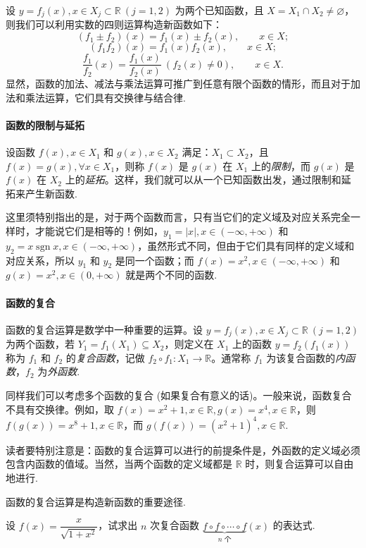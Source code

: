 设 $y=f_j(x),x\in X_j\subset\mathbb{R}\ (j=1,2)$ 为两个已知函数，且 $X=X_1\cap X_2\ne\varnothing$，则我们可以利用实数的四则运算构造新函数如下：
\[
  (f_1\pm f_2)(x)=f_1(x)\pm f_2(x),\qquad x\in X;
\]
\[
  (f_1f_2)(x)=f_1(x)f_2(x),\qquad x\in X;
\]
\[
  \frac{f_1}{f_2}(x)=\frac{f_1(x)}{f_2(x)}\ (f_2(x)\ne0),\qquad x\in X.
\]
显然，函数的加法、减法与乘法运算可推广到任意有限个函数的情形，而且对于加法和乘法运算，它们具有交换律与结合律.

\paragraph*{函数的限制与延拓}


设函数 $f(x),x\in X_1$ 和 $g(x),x\in X_2$ 满足：$X_1\subset X_2$，且 $f(x)=g(x),\forall x\in X_1$，则称 $f(x)$ 是 $g(x)$ 在 $X_1$ 上的\emph{限制}，而 $g(x)$ 是 $f(x)$ 在 $X_2$ 上的\emph{延拓}。这样，我们就可以从一个已知函数出发，通过限制和延拓来产生新函数.

这里须特别指出的是，对于两个函数而言，只有当它们的定义域及对应关系完全一样时，才能说它们是相等的！例如，$y_1=|x|,x\in(-\infty,+\infty)$ 和 $y_2=x\operatorname{sgn}x,x\in(-\infty,+\infty)$，虽然形式不同，但由于它们具有同样的定义域和对应关系，所以 $y_1$ 和 $y_2$ 是同一个函数；而 $f(x)=x^2,x\in(-\infty,+\infty)$ 和 $g(x)=x^2,x\in(0,+\infty)$ 就是两个不同的函数.

\paragraph*{函数的复合}


函数的复合运算是数学中一种重要的运算。设 $y=f_j(x),x\in X_j\subset\mathbb{R}\ (j=1,2)$ 为两个函数，若 $Y_1=f_1(X_1)\subseteq X_2$，则定义在 $X_1$ 上的函数 $y=f_2(f_1(x))$ 称为 $f_1$ 和 $f_2$ 的\emph{复合函数}，记做 $f_2\circ f_1:X_1\to\mathbb{R}$。通常称 $f_1$ 为该复合函数的\emph{内函数}，$f_2$ 为\emph{外函数}.

同样我们可以考虑多个函数的复合 (如果复合有意义的话)。一般来说，函数复合不具有交换律。例如，取 $f(x)=x^2+1,x\in\mathbb{R},g(x)=x^4,x\in\mathbb{R}$，则 $f(g(x))=x^8+1,x\in\mathbb{R}$，而 $g(f(x))=(x^2+1)^4,x\in\mathbb{R}$.

读者要特别注意是：函数的复合运算可以进行的前提条件是，外函数的定义域必须包含内函数的值域。当然，当两个函数的定义域都是 $\mathbb{R}$ 时，则复合运算可以自由地进行.

函数的复合运算是构造新函数的重要途径.

\begin{example}\label{example:ma-1-2-6}
设 $f(x)=\dfrac{x}{\sqrt{1+x^2}}$，试求出 $n$ 次复合函数 $\underbrace{f\circ f\circ\cdots\circ f}_{n\text{ 个}}(x)$ 的表达式.
\end{example}


